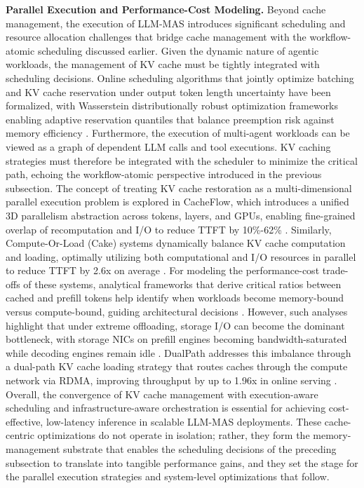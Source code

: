 \documentclass[11pt]{article}
\begin{document}
\textbf{Parallel Execution and Performance-Cost Modeling.} Beyond cache management, the execution of LLM-MAS introduces significant scheduling and resource allocation challenges that bridge cache management with the workflow-atomic scheduling discussed earlier. Given the dynamic nature of agentic workloads, the management of KV cache must be tightly integrated with scheduling decisions. Online scheduling algorithms that jointly optimize batching and KV cache reservation under output token length uncertainty have been formalized, with Wasserstein distributionally robust optimization frameworks enabling adaptive reservation quantiles that balance preemption risk against memory efficiency \cite{ref322}. Furthermore, the execution of multi-agent workloads can be viewed as a graph of dependent LLM calls and tool executions. KV caching strategies must therefore be integrated with the scheduler to minimize the critical path, echoing the workflow-atomic perspective introduced in the previous subsection. The concept of treating KV cache restoration as a multi-dimensional parallel execution problem is explored in CacheFlow, which introduces a unified 3D parallelism abstraction across tokens, layers, and GPUs, enabling fine-grained overlap of recomputation and I/O to reduce TTFT by 10\%-62\% \cite{ref323}. Similarly, Compute-Or-Load (Cake) systems dynamically balance KV cache computation and loading, optimally utilizing both computational and I/O resources in parallel to reduce TTFT by 2.6x on average \cite{ref324}. For modeling the performance-cost trade-offs of these systems, analytical frameworks that derive critical ratios between cached and prefill tokens help identify when workloads become memory-bound versus compute-bound, guiding architectural decisions \cite{ref325}. However, such analyses highlight that under extreme offloading, storage I/O can become the dominant bottleneck, with storage NICs on prefill engines becoming bandwidth-saturated while decoding engines remain idle \cite{ref326}. DualPath addresses this imbalance through a dual-path KV cache loading strategy that routes caches through the compute network via RDMA, improving throughput by up to 1.96x in online serving \cite{ref326}. Overall, the convergence of KV cache management with execution-aware scheduling and infrastructure-aware orchestration is essential for achieving cost-effective, low-latency inference in scalable LLM-MAS deployments. These cache-centric optimizations do not operate in isolation; rather, they form the memory-management substrate that enables the scheduling decisions of the preceding subsection to translate into tangible performance gains, and they set the stage for the parallel execution strategies and system-level optimizations that follow.
\end{document}
